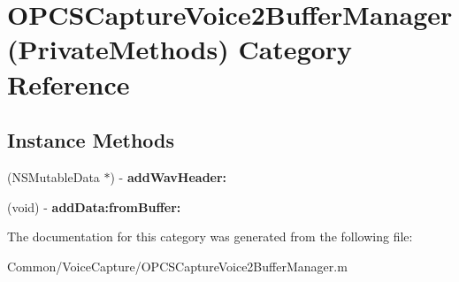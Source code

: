 \hypertarget{category_o_p_c_s_capture_voice2_buffer_manager_07_private_methods_08}{}\section{O\+P\+C\+S\+Capture\+Voice2\+Buffer\+Manager(Private\+Methods) Category Reference}
\label{category_o_p_c_s_capture_voice2_buffer_manager_07_private_methods_08}
\subsection*{Instance Methods}
\begin{DoxyCompactItemize}
\item 
\hypertarget{category_o_p_c_s_capture_voice2_buffer_manager_07_private_methods_08_a3173aecb8ab0fa080caa50be5cf405d8}{}\label{category_o_p_c_s_capture_voice2_buffer_manager_07_private_methods_08_a3173aecb8ab0fa080caa50be5cf405d8} 
(N\+S\+Mutable\+Data $\ast$) -\/ {\bfseries add\+Wav\+Header\+:}
\item 
\hypertarget{category_o_p_c_s_capture_voice2_buffer_manager_07_private_methods_08_a0f5ef32e63c85c0311097fef58f77974}{}\label{category_o_p_c_s_capture_voice2_buffer_manager_07_private_methods_08_a0f5ef32e63c85c0311097fef58f77974} 
(void) -\/ {\bfseries add\+Data\+:from\+Buffer\+:}
\end{DoxyCompactItemize}


The documentation for this category was generated from the following file\+:\begin{DoxyCompactItemize}
\item 
Common/\+Voice\+Capture/O\+P\+C\+S\+Capture\+Voice2\+Buffer\+Manager.\+m\end{DoxyCompactItemize}
